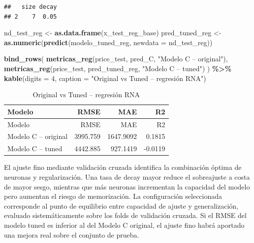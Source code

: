 \documentclass[
]{article}
\newenvironment{Shaded}{\begin{snugshade}}{\end{snugshade}}
\newcommand{\AttributeTok}[1]{\textcolor[rgb]{0.13,0.29,0.53}{#1}}
\newcommand{\DecValTok}[1]{\textcolor[rgb]{0.00,0.00,0.81}{#1}}
\newcommand{\FunctionTok}[1]{\textcolor[rgb]{0.13,0.29,0.53}{\textbf{#1}}}
\newcommand{\NormalTok}[1]{#1}
\newcommand{\OtherTok}[1]{\textcolor[rgb]{0.56,0.35,0.01}{#1}}
\newcommand{\SpecialCharTok}[1]{\textcolor[rgb]{0.81,0.36,0.00}{\textbf{#1}}}
\newcommand{\StringTok}[1]{\textcolor[rgb]{0.31,0.60,0.02}{#1}}
\begin{document}
\begin{verbatim}
##   size decay
## 2    7  0.05
\end{verbatim}

\begin{Shaded}
\begin{Highlighting}[]
\NormalTok{nd\_test\_reg }\OtherTok{\textless{}{-}} \FunctionTok{as.data.frame}\NormalTok{(x\_test\_reg\_base)}
\NormalTok{pred\_tuned\_reg }\OtherTok{\textless{}{-}} \FunctionTok{as.numeric}\NormalTok{(}\FunctionTok{predict}\NormalTok{(modelo\_tuned\_reg, }\AttributeTok{newdata =}\NormalTok{ nd\_test\_reg))}

\FunctionTok{bind\_rows}\NormalTok{(}
  \FunctionTok{metricas\_reg}\NormalTok{(price\_test, pred\_C, }\StringTok{"Modelo C – original"}\NormalTok{),}
  \FunctionTok{metricas\_reg}\NormalTok{(price\_test, pred\_tuned\_reg, }\StringTok{"Modelo C – tuned"}\NormalTok{)}
\NormalTok{) }\SpecialCharTok{\%\textgreater{}\%}
  \FunctionTok{kable}\NormalTok{(}\AttributeTok{digits =} \DecValTok{4}\NormalTok{, }\AttributeTok{caption =} \StringTok{"Original vs Tuned – regresión RNA"}\NormalTok{)}
\end{Highlighting}
\end{Shaded}

\begin{longtable}[]{@{}lrrr@{}}
\caption{Original vs Tuned -- regresión RNA}\tabularnewline
\toprule\noalign{}
Modelo & RMSE & MAE & R2 \\
\midrule\noalign{}
\endfirsthead
\toprule\noalign{}
Modelo & RMSE & MAE & R2 \\
\midrule\noalign{}
\endhead
\bottomrule\noalign{}
\endlastfoot
Modelo C -- original & 3995.759 & 1647.9092 & 0.1815 \\
Modelo C -- tuned & 4442.885 & 927.1419 & -0.0119 \\
\end{longtable}

El ajuste fino mediante validación cruzada identifica la combinación
óptima de neuronas y regularización. Una tasa de decay mayor reduce el
sobreajuste a costa de mayor sesgo, mientras que más neuronas
incrementan la capacidad del modelo pero aumentan el riesgo de
memorización. La configuración seleccionada corresponde al punto de
equilibrio entre capacidad de ajuste y generalización, evaluado
sistemáticamente sobre los folds de validación cruzada. Si el RMSE del
modelo tuned es inferior al del Modelo C original, el ajuste fino habrá
aportado una mejora real sobre el conjunto de prueba.
\end{document}
